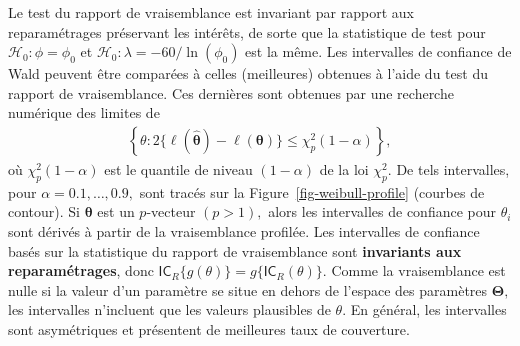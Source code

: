 \documentclass[
  11pt,
  letterpaper,
]{scrbook}
\theoremstyle{plain}
\theoremstyle{plain}
\theoremstyle{definition}
\theoremstyle{definition}
\theoremstyle{remark}
\begin{document}
Le test du rapport de vraisemblance est invariant par rapport aux
reparamétrages préservant les intérêts, de sorte que la statistique de
test pour \(\mathscr{H}_0: \phi=\phi_0\) et
\(\mathscr{H}_0: \lambda = -60/\ln(\phi_0)\) est la même. Les
intervalles de confiance de Wald peuvent être comparées à celles
(meilleures) obtenues à l'aide du test du rapport de vraisemblance. Ces
dernières sont obtenues par une recherche numérique des limites de
\begin{align*}
\left\{\theta: 2\{\ell(\widehat{\boldsymbol{\theta}}) - \ell(\boldsymbol{\theta})\} \leq \chi^2_p(1-\alpha)\right\},
\end{align*} où \(\chi^2_p(1-\alpha)\) est le quantile de niveau
\((1-\alpha)\) de la loi \(\chi^2_p.\) De tels intervalles, pour
\(\alpha = 0.1, \ldots, 0.9,\) sont tracés sur la
Figure~\ref{fig-weibull-profile} (courbes de contour). Si
\(\boldsymbol{\theta}\) est un \(p\)-vecteur \((p> 1),\) alors les
intervalles de confiance pour \(\theta_i\) sont dérivés à partir de la
vraisemblance profilée. Les intervalles de confiance basés sur la
statistique du rapport de vraisemblance sont \textbf{invariants aux
reparamétrages}, donc
\(\mathsf{IC}_{R}\{g(\theta)\} = g\{\mathsf{IC}_{R}(\theta)\}.\) Comme
la vraisemblance est nulle si la valeur d'un paramètre se situe en
dehors de l'espace des paramètres \(\boldsymbol{\Theta},\) les
intervalles n'incluent que les valeurs plausibles de \(\theta.\) En
général, les intervalles sont asymétriques et présentent de meilleures
taux de couverture.
\end{document}
